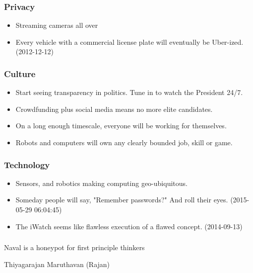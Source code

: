 \begin{frame}[fragile]\frametitle{Privacy}

\begin{itemize}
\item Streaming cameras all over
\item Every vehicle with a commercial license plate will eventually be Uber-ized. (2012-12-12)
\end{itemize}

\end{frame}

\begin{frame}[fragile]\frametitle{Culture}

\begin{itemize}
\item Start seeing transparency in politics.  Tune in to watch the President 24/7. 
\item Crowdfunding plus social media means no more elite candidates.
\item On a long enough timescale, everyone will be working for themselves.
\item Robots and computers will own any clearly bounded job, skill or game.
\end{itemize}

\end{frame}

\begin{frame}[fragile]\frametitle{Technology}

\begin{itemize}
\item Sensors, and robotics making computing geo-ubiquitous.
\item Someday people will say, "Remember passwords?" And roll their eyes. (2015-05-29 06:04:45)
\item The iWatch seems like flawless execution of a flawed concept. (2014-09-13)
\end{itemize}

\end{frame}

\begin{frame}[fragile]\frametitle{}
\begin{center}
{\Large Naval is a honeypot for first principle thinkers}

{\small Thiyagarajan Maruthavan (Rajan)}


\end{center}
\end{frame}


